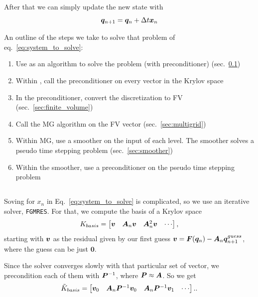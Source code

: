 \documentclass{article}
\begin{document}
After that we can simply update the new state with
\begin{equation}
    \bm{q}_{n+1} = \bm{q}_n + \Delta t\bm{x}_n
\end{equation}

An outline of the steps we take to solve that problem of eq.~\ref{eq:system_to_solve}:
\begin{enumerate}
    \item Use \fgmres{} as an algorithm to solve the problem (with preconditioner) (sec.~\ref{sec:fgmres})
    \item Within \fgmres, call the preconditioner on every vector in the Krylov space 
    \item In the preconditioner, convert the discretization to FV (sec.~\ref{sec:finite_volume})
    \item Call the MG algorithm on the FV vector (sec.~\ref{sec:multigrid})
    \item Within MG, use a smoother on the input of each level. The smoother solves a pseudo time stepping problem (sec.~\ref{sec:smoother})
    \item Within the smoother, use a preconditioner on the pseudo time stepping problem
\end{enumerate}


\subsection{\fgmres}\label{sec:fgmres}

Soving for $x_n$ in Eq.~\ref{eq:system_to_solve} is complicated, so we use an iterative solver, \texttt{FGMRES}.
For that, we compute the basis of a Krylov space
$$K_{basis} = \left[\begin{matrix} \bm{v} & \bm{A}_n\bm{v} & \bm{A}_n^2 \bm{v} & \cdots \end{matrix}\right],$$
 starting with $\bm{v}$ as the residual given by our first guess
$\bm{v} = \bm{F}(\bm{q}_{n}) - \bm{A}_n \bm{q}_{n+1}^{guess}$, where the guess can be just $\bm{0}$.

Since the solver converges slowly with that particular set of vector, we precondition each of them
with $\bm{P}^{-1}$, where $\bm{P}\approx\bm{A}$.
So we get 
\begin{equation}
\tilde{K}_{basis} = \left[\begin{matrix}
    \bm{v}_0 &
    \bm{A}_n\bm{P}^{-1}\bm{v}_0 &
    \bm{A}_n\bm{P}^{-1}\bm{v}_1 & \cdots \end{matrix}\right].
    \text{.}
\end{equation}
\end{document}
